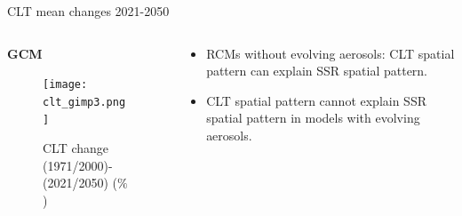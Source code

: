 \documentclass{beamer}%
\begin{document}
\begin{frame}[fragile]{CLT mean changes 2021-2050}
\vspace{1\baselineskip}
\begin{columns}
  \begin{column}{0.7\textwidth}
    \hspace{2\baselineskip}\LARGE{\textbf{GCM}}
    \begin{figure}
      \texttt{[image: clt\_gimp3.png]}
        \centering\caption{CLT change (1971/2000)-(2021/2050) ($\%$)}
    \end{figure}
  \end{column}
  \begin{column}{0.4\textwidth}
      \begin{itemize}
        \centering\vspace{0.05\baselineskip}\item RCMs without evolving aerosols: CLT spatial pattern can explain SSR spatial pattern.
        \centering\item CLT spatial pattern cannot explain SSR spatial pattern in models with evolving aerosols.
      \end{itemize}
    \end{column}
    \end{columns}
\end{frame}

\end{document}
